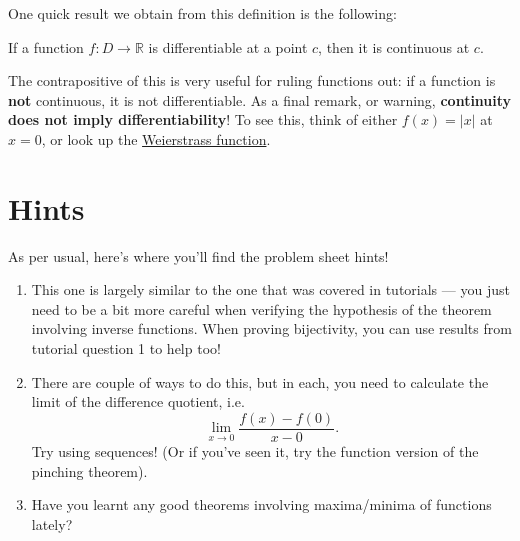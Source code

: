 \documentclass[
  12pt,
  a4paper]{extarticle}
\providecommand{\tightlist}{%
  \setlength{\itemsep}{0pt}\setlength{\parskip}{0pt}}
\theoremstyle{plain}
\theoremstyle{definition}
\theoremstyle{plain}
\theoremstyle{plain}
\theoremstyle{plain}
\theoremstyle{plain}
\theoremstyle{definition}
\theoremstyle{definition}
\theoremstyle{remark}
\theoremstyle{remark}
\let\BeginKnitrBlock\begin \let\EndKnitrBlock\end
\renewcommand{\;}{\,}
\begin{document}
One quick result we obtain from this definition is the following:
\BeginKnitrBlock{proposition}
{\label{prp:prop2} }If a function \(f:D \to \mathbb{R}\) is differentiable at a point \(c\), then it is continuous at \(c\).
\EndKnitrBlock{proposition}
The contrapositive of this is very useful for ruling functions out: if a function is \textbf{not} continuous, it is not differentiable. As a final remark, or warning, \textbf{continuity does not imply differentiability}! To see this, think of either \(f(x) = \lvert x \rvert\) at \(x = 0\), or look up the \href{https://en.wikipedia.org/wiki/Weierstrass_function}{Weierstrass function}.

\hypertarget{hints}{%
\section{Hints}\label{hints}}

As per usual, here's where you'll find the problem sheet hints!

\begin{enumerate}
\def\labelenumi{\arabic{enumi})}
\tightlist
\item
  This one is largely similar to the one that was covered in tutorials --- you just need to be a bit more careful when verifying the hypothesis of the theorem involving inverse functions. When proving bijectivity, you can use results from tutorial question 1 to help too!
\item
  There are couple of ways to do this, but in each, you need to calculate the limit of the difference quotient, i.e.~\[\lim_{x\to 0 }\frac{f(x) - f(0)}{x - 0}.\] Try using sequences! (Or if you've seen it, try the function version of the pinching theorem).
\item
  Have you learnt any good theorems involving maxima/minima of functions lately?
\end{enumerate}
\end{document}
